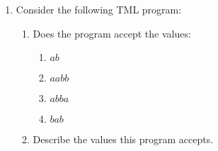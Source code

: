 \documentclass[answers]{exam}
\begin{document}
\begin{enumerate}
        \item Consider the following TML program:
        
        \begin{enumerate}
            \item Does the program accept the values:
            \begin{enumerate}
                \item $ab$
                \begin{solution}
                    
                \end{solution}
                
                \item $aabb$
                \begin{solution}
                    
                \end{solution}
                \newpage
                
                \item $abba$
                \begin{solution}
                    
                \end{solution}
                
                \item $bab$
                \begin{solution}
                    
                \end{solution}
            \end{enumerate}
            
            \item Describe the values this program accepts.
            \begin{solution}
                \vspace*{30pt}
            \end{solution}
        \end{enumerate}
    \end{enumerate}
    
    \newpage
\end{document}
